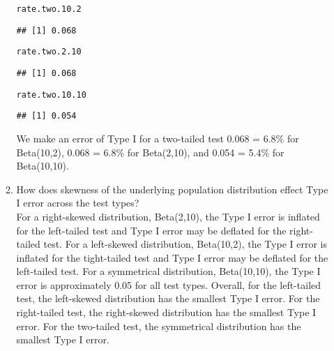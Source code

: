 \documentclass{article}\usepackage[]{graphicx}\usepackage[]{xcolor}
\makeatletter
\newcommand{\hldef}[1]{\textcolor[rgb]{0.345,0.345,0.345}{#1}}%
\newenvironment{kframe}{%
 \def\at@end@of@kframe{}%
 \ifinner\ifhmode%
  \def\at@end@of@kframe{\end{minipage}}%
  \begin{minipage}{\columnwidth}%
 \fi\fi%
 \def\FrameCommand##1{\hskip\@totalleftmargin \hskip-\fboxsep
 \colorbox{shadecolor}{##1}\hskip-\fboxsep
     \hskip-\linewidth \hskip-\@totalleftmargin \hskip\columnwidth}%
 \MakeFramed {\advance\hsize-\width
   \@totalleftmargin\z@ \linewidth\hsize
   \@setminipage}}%
 {\par\unskip\endMakeFramed%
 \at@end@of@kframe}
\newenvironment{knitrout}{}{} %
\makeatother
\begin{document}
\begin{enumerate}
\begin{enumerate}
\begin{knitrout}
\begin{kframe}
\begin{alltt}
\hldef{rate.two.10.2}
\end{alltt}
\begin{verbatim}
## [1] 0.068
\end{verbatim}
\begin{alltt}
\hldef{rate.two.2.10}
\end{alltt}
\begin{verbatim}
## [1] 0.068
\end{verbatim}
\begin{alltt}
\hldef{rate.two.10.10}
\end{alltt}
\begin{verbatim}
## [1] 0.054
\end{verbatim}
\end{kframe}
\end{knitrout}
We make an error of Type I for a two-tailed test 0.068 = 6.8\% for Beta(10,2),  0.068 = 6.8\% for Beta(2,10), and 0.054 = 5.4\% for Beta(10,10).
    \item How does skewness of the underlying population distribution effect
    Type I error across the test types? \\
    For a right-skewed distribution, Beta(2,10), the Type I error is inflated for the left-tailed test and Type I error may be deflated for the right-tailed test. For a left-skewed distribution, Beta(10,2), the Type I error is inflated for the tight-tailed test and Type I error may be deflated for the left-tailed test. For a symmetrical distribution, Beta(10,10), the Type I error is approximately 0.05 for all test types.
    Overall, for the left-tailed test, the left-skewed distribution has the smallest Type I error. For the right-tailed test, the right-skewed distribution has the smallest Type I error. For the two-tailed test, the symmetrical distribution has the smallest Type I error.  
  \end{enumerate}
\end{enumerate}

\end{document}

